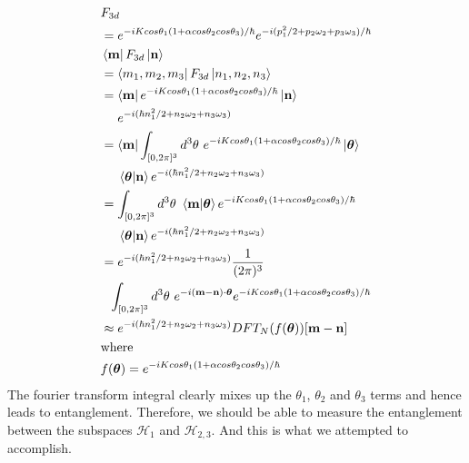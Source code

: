 \documentclass[twocolumn]{report}
\begin{document}
\begin{align}
    &F_{3d} \\
    &= e^{-i K cos\theta_1 (1 + \alpha cos\theta_2 cos\theta_3) / \hbar}
    e^{-i (p_1^2 / 2 + p_2 \omega_2 + p_3 \omega_3)/\hbar} \\
    &\bra{\mathbf{m}} F_{3d} \ket{\mathbf{n}} \\
    &= \bra{m_1, m_2, m_3}F_{3d}\ket{n_1, n_2, n_3} \\
    &= \bra{\mathbf{m}}
    e^{-i K cos\theta_1 (1 + \alpha cos\theta_2 cos\theta_3) / \hbar}
    \ket{\mathbf{n}} \\
    &\ \ \ \ e^{-i (\hbar n_1^2 / 2 + n_2 \omega_2 + n_3 \omega_3)} \\
    &= \bra{\mathbf{m}} \int_{[0,2\pi]^3} d^3\theta \
    e^{-i K cos\theta_1 (1 + \alpha cos\theta_2 cos\theta_3) / \hbar}
    \ket{\boldsymbol{\theta}}\\
    &\ \ \ \ \braket{\boldsymbol{\theta}|\mathbf{n}}
    e^{-i (\hbar n_1^2 / 2 + n_2 \omega_2 + n_3 \omega_3)} \\
    &= \int_{[0,2\pi]^3} d^3\theta \ \braket{\mathbf{m}|\boldsymbol{\theta}}
    e^{-i K cos\theta_1 (1 + \alpha cos\theta_2 cos\theta_3) / \hbar}\\
    &\ \ \ \ \braket{\boldsymbol{\theta}|\mathbf{n}}
    e^{-i (\hbar n_1^2 / 2 + n_2 \omega_2 + n_3 \omega_3)} \\
    &= e^{-i (\hbar n_1^2 / 2 + n_2 \omega_2 + n_3 \omega_3)}
    \frac{1}{(2\pi)^3} \\
    &\ \ \int_{[0,2\pi]^3} d^3\theta \
    e^{-i(\mathbf{m} - \mathbf{n})\cdot \boldsymbol{\theta}}
    e^{-i K cos\theta_1 (1 + \alpha cos\theta_2 cos\theta_3) / \hbar}\\
    &\approx e^{-i (\hbar n_1^2 / 2 + n_2 \omega_2 + n_3 \omega_3)}
    DFT_N(f(\boldsymbol{\theta}))[\mathbf{m} - \mathbf{n}]\\
    &\text{where } \nonumber\\
    &f(\boldsymbol{\theta}) =
    e^{-i K cos\theta_1 (1 + \alpha cos\theta_2 cos\theta_3) / \hbar}
\end{align}
%
The fourier transform integral clearly mixes up the $\theta_1$, $\theta_2$
and $\theta_3$ terms and hence leads to entanglement. Therefore, we
should be able to measure the entanglement between the subspaces
$\mathcal{H}_1$ and $\mathcal{H}_{2,3}$. And this is what we attempted
to accomplish.
\end{document}
